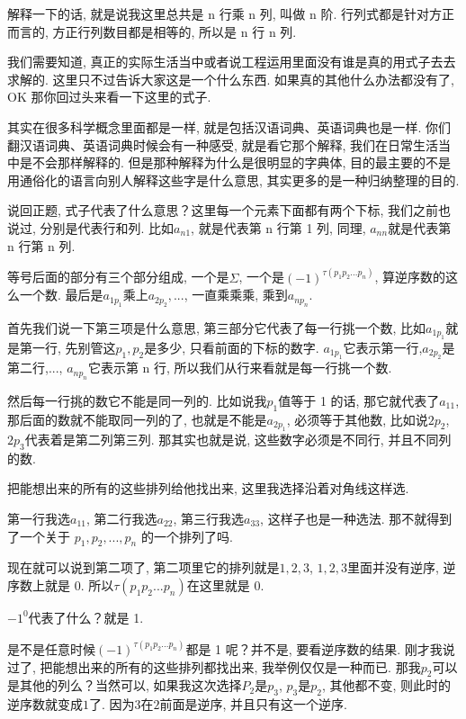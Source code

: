 解释一下的话, 就是说我这里总共是 n 行乘 n 列, 叫做 n 阶. 行列式都是针对方正而言的, 方正行列数目都是相等的, 所以是 n 行 n 列. 

我们需要知道, 真正的实际生活当中或者说工程运用里面没有谁是真的用式子去去求解的. 这里只不过告诉大家这是一个什么东西. 如果真的其他什么办法都没有了, OK 那你回过头来看一下这里的式子. 

其实在很多科学概念里面都是一样, 就是包括汉语词典、英语词典也是一样. 你们翻汉语词典、英语词典时候会有一种感受, 就是看它那个解释, 我们在日常生活当中是不会那样解释的. 但是那种解释为什么是很明显的字典体, 目的最主要的不是用通俗化的语言向别人解释这些字是什么意思, 其实更多的是一种归纳整理的目的. 

说回正题, 式子代表了什么意思？这里每一个元素下面都有两个下标, 我们之前也说过, 分别是代表行和列. 比如$a_{n1}$, 就是代表第 n 行第 1 列, 同理, $a_{nn}$就是代表第 n 行第 n 列. 

等号后面的部分有三个部分组成, 一个是$\Sigma$, 一个是$(-1)^{\tau(p_1p_2...p_n)}$, 算逆序数的这么一个数. 最后是$a_{1p_1}$乘上$a_{2p_2}, ...$,  一直乘乘乘, 乘到$a_{np_n}$. 

首先我们说一下第三项是什么意思, 第三部分它代表了每一行挑一个数, 比如$a_{1p_1}$就是第一行, 先别管这$p_1, p_2$是多少, 只看前面的下标的数字. $a_{1p_1}$它表示第一行,$a_{2p_2}$是第二行,..., $a_{np_n}$它表示第 n 行, 所以我们从行来看就是每一行挑一个数. 

然后每一行挑的数它不能是同一列的. 比如说我$p_1$值等于 1 的话, 那它就代表了$a_{11}$,  那后面的数就不能取同一列的了, 也就是不能是$a_{2p_1}$, 必须等于其他数, 比如说$2p_2$, $2p_3$代表着是第二列第三列. 那其实也就是说, 这些数字必须是不同行, 并且不同列的数. 

把能想出来的所有的这些排列给他找出来, 这里我选择沿着对角线这样选. 

第一行我选$a_{11}$, 第二行我选$a_{22}$, 第三行我选$a_{33}$, 这样子也是一种选法. 那不就得到了一个关于 $p_1, p_2, ..., p_n$ 的一个排列了吗. 

现在就可以说到第二项了, 第二项里它的排列就是$1, 2, 3$, $1, 2, 3$里面并没有逆序, 逆序数上就是 0. 所以$\tau(p_1p_2...p_n)$在这里就是 0. 

$-1^0$代表了什么？就是 1. 

是不是任意时候$(-1)^{\tau(p_1p_2...p_n)}$都是 1 呢？并不是, 要看逆序数的结果. 刚才我说过了, 把能想出来的所有的这些排列都找出来, 我举例仅仅是一种而已. 那我$p_2$可以是其他的列么？当然可以, 如果我这次选择$P_2$是$p_3$,  $p_3$是$p_2$, 其他都不变, 则此时的逆序数就变成$1$了. 因为$3$在$2$前面是逆序, 并且只有这一个逆序. 

